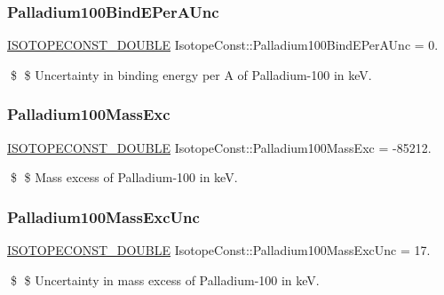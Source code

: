 \subsubsection{\texorpdfstring{Palladium100\+Bind\+E\+Per\+A\+Unc}{Palladium100BindEPerAUnc}}
{\footnotesize\ttfamily \mbox{\hyperlink{group___isotope_const-_macros_ga8f45a7272ce02c0b4c65c44636ed719a}{I\+S\+O\+T\+O\+P\+E\+C\+O\+N\+S\+T\+\_\+\+D\+O\+U\+B\+LE}} Isotope\+Const\+::\+Palladium100\+Bind\+E\+Per\+A\+Unc = 0.}

\$ \$ Uncertainty in binding energy per A of Palladium-\/100 in keV. \mbox{\label{group___isotope_const-_palladium-_pd100_gad414ba95fc583f283d3efb3d7b70df80}} 
\subsubsection{\texorpdfstring{Palladium100\+Mass\+Exc}{Palladium100MassExc}}
{\footnotesize\ttfamily \mbox{\hyperlink{group___isotope_const-_macros_ga8f45a7272ce02c0b4c65c44636ed719a}{I\+S\+O\+T\+O\+P\+E\+C\+O\+N\+S\+T\+\_\+\+D\+O\+U\+B\+LE}} Isotope\+Const\+::\+Palladium100\+Mass\+Exc = -\/85212.}

\$ \$ Mass excess of Palladium-\/100 in keV. \mbox{\label{group___isotope_const-_palladium-_pd100_ga0e0fb7425f1a634e51905ff83370c33c}} 
\subsubsection{\texorpdfstring{Palladium100\+Mass\+Exc\+Unc}{Palladium100MassExcUnc}}
{\footnotesize\ttfamily \mbox{\hyperlink{group___isotope_const-_macros_ga8f45a7272ce02c0b4c65c44636ed719a}{I\+S\+O\+T\+O\+P\+E\+C\+O\+N\+S\+T\+\_\+\+D\+O\+U\+B\+LE}} Isotope\+Const\+::\+Palladium100\+Mass\+Exc\+Unc = 17.}

\$ \$ Uncertainty in mass excess of Palladium-\/100 in keV. \mbox{\label{group___isotope_const-_palladium-_pd100_ga06131f01100f8a7b8f5897e8553d3e2a}} 
